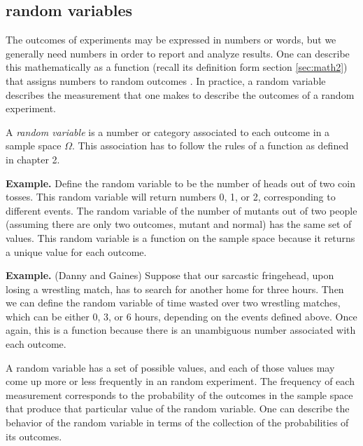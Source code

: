 \documentclass[
  letterpaper,
  DIV=11,
  numbers=noendperiod]{scrreprt}
\begin{document}
\hypertarget{random-variables}{%
\subsection{random variables}\label{random-variables}}

The outcomes of experiments may be expressed in numbers or words, but we
generally need numbers in order to report and analyze results. One can
describe this mathematically as a function (recall its definition form
section \ref{sec:math2}) that assigns numbers to random outcomes
\cite{feller_introduction_????}. In practice, a random variable
describes the measurement that one makes to describe the outcomes of a
random experiment.

\begin{tcolorbox}[enhanced jigsaw, coltitle=black, arc=.35mm, opacitybacktitle=0.6, breakable, bottomtitle=1mm, toptitle=1mm, titlerule=0mm, colback=white, leftrule=.75mm, rightrule=.15mm, colframe=quarto-callout-note-color-frame, colbacktitle=quarto-callout-note-color!10!white, opacityback=0, title=\textcolor{quarto-callout-note-color}{\faInfo}\hspace{0.5em}{Definition}, left=2mm, toprule=.15mm, bottomrule=.15mm]

A \emph{random variable} is a number or category associated to each
outcome in a sample space \(\Omega\). This association has to follow the
rules of a function as defined in chapter 2.

\end{tcolorbox}

\textbf{Example.} Define the random variable to be the number of heads
out of two coin tosses. This random variable will return numbers 0, 1,
or 2, corresponding to different events. The random variable of the
number of mutants out of two people (assuming there are only two
outcomes, mutant and normal) has the same set of values. This random
variable is a function on the sample space because it returns a unique
value for each outcome.

\textbf{Example.} (Danny and Gaines) Suppose that our sarcastic
fringehead, upon losing a wrestling match, has to search for another
home for three hours. Then we can define the random variable of time
wasted over two wrestling matches, which can be either 0, 3, or 6 hours,
depending on the events defined above. Once again, this is a function
because there is an unambiguous number associated with each outcome.

A random variable has a set of possible values, and each of those values
may come up more or less frequently in an random experiment. The
frequency of each measurement corresponds to the probability of the
outcomes in the sample space that produce that particular value of the
random variable. One can describe the behavior of the random variable in
terms of the collection of the probabilities of its outcomes.
\end{document}
